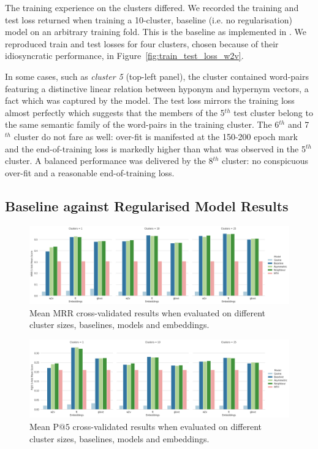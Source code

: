 The training experience on the clusters differed.  We recorded the training and test loss returned when training a 10-cluster, baseline (i.e. no regularisation) model on an arbitrary training fold. This is the \citep{Fu2014} baseline as implemented in \citep{ustalov2017negative}.  We reproduced train and test losses for four clusters, chosen because of their idiosyncratic performance, in Figure~\ref{fig:train_test_loss_w2v}.

In some cases, such as \textit{cluster 5} (top-left panel), the cluster contained word-pairs featuring a distinctive linear relation between hyponym and hypernym vectors, a fact which was captured by the model.  The test loss mirrors the training loss almost perfectly which suggests that the members of the 5$^{th}$ test cluster belong to the same semantic family of the word-pairs in the training cluster.  The 6$^{th}$ and 7$^{th}$ cluster do not fare as well: over-fit is manifested at the 150-200 epoch mark and the end-of-training loss is markedly higher than what was observed in the 5$^{th}$ cluster.  A balanced performance was delivered by the 8$^{th}$ cluster: no conspicuous over-fit and a reasonable end-of-training loss.

\subsection{Baseline against Regularised Model Results}
\begin{figure}[ht!] 
  \centering
  \includegraphics[width=1.\linewidth]{images/MRR_5-fold_results_models_baselines_embeddings.png}
  \caption{Mean MRR cross-validated results when evaluated on different cluster sizes, baselines, models and embeddings.}
  \label{fig:MRR_models_baselines}
\end{figure}

\begin{figure}[ht!] 
  \centering
  \includegraphics[width=1.\linewidth]{images/PAt5_5-fold_results_models_baselines_embeddings.png}
  \caption{Mean P$@5$ cross-validated results when evaluated on different cluster sizes, baselines, models and embeddings.}
  \label{fig:pat5_models_baselines}
\end{figure}

